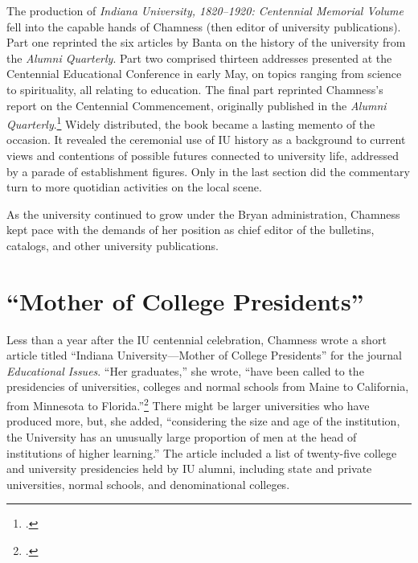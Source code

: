 \documentclass[
  american,
  letterpaper,
]{scrreprt}
\begin{document}
The production of \emph{Indiana University, 1820--1920: Centennial
Memorial Volume} fell into the capable hands of Chamness (then editor of
university publications). Part one reprinted the six articles by Banta
on the history of the university from the \emph{Alumni Quarterly}. Part
two comprised thirteen addresses presented at the Centennial Educational
Conference in early May, on topics ranging from science to spirituality,
all relating to education. The final part reprinted Chamness's report on
the Centennial Commencement, originally published in the \emph{Alumni
Quarterly}.\footnote{.} Widely distributed, the book became a
lasting memento of the occasion. It revealed the ceremonial use of IU
history as a background to current views and contentions of possible
futures connected to university life, addressed by a parade of
establishment figures. Only in the last section did the commentary turn
to more quotidian activities on the local scene.

As the university continued to grow under the Bryan administration,
Chamness kept pace with the demands of her position as chief editor of
the bulletins, catalogs, and other university publications.

\section{``Mother of College
Presidents''}\label{mother-of-college-presidents}

Less than a year after the IU centennial celebration, Chamness wrote a
short article titled ``Indiana University---Mother of College
Presidents'' for the journal \emph{Educational Issues}. ``Her
graduates,'' she wrote, ``have been called to the presidencies of
universities, colleges and normal schools from Maine to California, from
Minnesota to Florida.''\footnote{.} There might be larger universities
who have produced more, but, she added, ``considering the size and age
of the institution, the University has an unusually large proportion of
men at the head of institutions of higher learning.'' The article
included a list of twenty-five college and university presidencies held
by IU alumni, including state and private universities, normal schools,
and denominational colleges.
\end{document}
